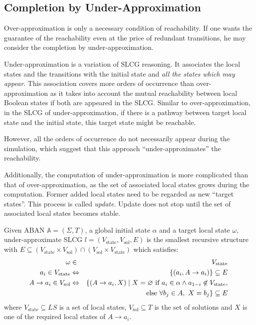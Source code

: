 \subsection{Completion by Under-Approximation}\label{sec:completionUnder}
Over-approximation is only a necessary condition of reachability.
If one wants the guarantee of the reachability even at the price of redundant transitions, he may consider the completion by under-approximation.

Under-approximation is a variation of SLCG reasoning. 
It associates the local states and the transitions with the initial state and \textit{all the states which may appear}.
This association covers more orders of occurrence than over-approximation as it takes into account the mutual reachability between local Boolean states if both are appeared in the SLCG.
Similar to over-approximation, in the SLCG of under-approximation, if there is a pathway between target local state and the initial state, this target state might be reachable.

However, all the orders of occurrence do not necessarily appear during the simulation, which suggest that this approach ``under-approximates'' the reachability.

Additionally, the computation of under-approximation is more complicated than that of over-approximation, as the set of associated local states grows during the computation.
Former added local states need to be regarded as new ``target states''.
This process is called \textit{update}. 
Update does not stop until the set of associated local states becomes stable.


\begin{definition}
Given ABAN $\mathbb{A} = (\Sigma,T)$, a global initial state $\alpha$ and a target local state $\omega$, under-approximate SLCG $l= (V_{\mathrm{state}},V_{\mathrm{sol}},E)$ is the smallest recursive structure with $E \subseteq (V_{\mathrm{state}}\times V_{\mathrm{sol}})\cap (V_{\mathrm{sol}}\times V_{\mathrm{state}})$ which satisfies:
\begin{eqnarray*}
    \omega&\in& V_{\mathrm{state}} \\
    a_i\in V_{\mathrm{state}} &\Leftrightarrow& \{ (a_i, A\to a_i)\}\subseteq E \\
    A\to a_i\in V_{\mathrm{sol}}&\Leftrightarrow& \{ (A\to a_i,X)\mid X= \varnothing \text{ \rm if } a_i\in \alpha\land a_{1-i}\not\in V_{\mathrm{state}},\\
    &&\text{else } \forall b_j\in A,\ X= b_j\}\subseteq E
\end{eqnarray*}
where $V_{\mathrm{state}}\subseteq LS$ is a set of local states, $V_{\mathrm{sol}}\subseteq T$ is the set of solutions and $X$ is one of the required local states of $A\to a_i$. 
\end{definition}

